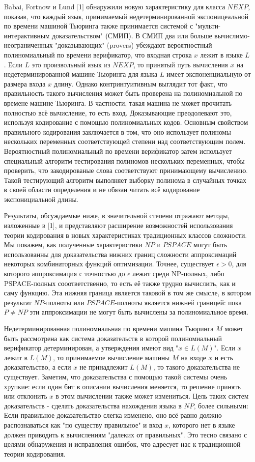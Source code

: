 \documentclass{article}
\newcommand{\blank} {
\newline
\newline
}
\theoremstyle{definition}
\begin{document}
\noindent Babai, Fortnow и Lund [1] обнаружили новую характеристику для класса $NEXP$, показав, что каждый язык, принимаемый недетерминированной экспоницеальной по времени машиной Тьюринга также принимается системой с "мульти-интерактивным доказательством" (СМИП). В СМИП два или больше вычислимо-неограниченных "доказывающих" (provers) убеждают вероятностный полиномиальный по времени верификатор, что входная строка $x$ лежит в языке $L$. Если $L$ это произвольный язык из $NEXP$, то принятый путь вычисления $x$ на недетерминированной машине Тьюринга для языка $L$ имеет экспоненциальную от размера входа $x$ длину. Однако контринтуитивным выглядит тот факт, что правильность такого вычисления может быть проверена на полиномиальной по времене машине Тьюринга. В частности, такая машина не может прочитать полностью всё вычисление, то есть вход. Доказывающие преодолевают это, используя кодирование с помощью полиномиальных кодов. Основным свойством правильного кодирования заключается в том, что оно использует полиномы нескольких переменных соответствующей степени над соответствующим полем. Вероятностный полиномиальный по времени верификатор затем использует специальный алгоритм тестирования полиномов нескольких переменных, чтобы проверить, что закодированые слова соответствуют принимающему вычислению. Такой тестирующий алгоритм выполняет выборку полинома в случайных точках в своей области определения и не обязан читать всё кодирование экспонициальной длины.
\blank
Результаты, обсуждаемые ниже, в значительной степени отражают методы, изложенные в [1], и представляют расширение возможностей использования теории кодирования в новых характеристиках традиционных классов сложности. Мы покажем, как полученные характеристики $NP$ и $PSPACE$ могут быть использованны для доказательства нижних границ сложности аппроксимаций некоторых комбинаторных функций оптимизации. Точнее, существует $\epsilon > 0$, для которого аппроксимация с точностью до $\epsilon$ лежит среди NP-полных, либо PSPACE-полных сооответственно, то есть её также трудно вычислить, как и саму функцию. Эта нижняя граница является таковой в том же смысле,  в котором результат $NP$-полноты или $PSPACE$-полноты является нижней границей: пока $P \neq NP$ эти аппроксимации не могут быть вычислены за полиномиальное время.
\blank
Недетерминированная полиномиальная по времени машина Тьюринга $M$ может быть рассмотрена как система доказательств в которой полиномиальный верификатор детерминирован, а утверждения имеют вид "$x \in L(M)$". Если $x$ лежит в $L(M)$, то принимаемое вычисление машины $M$ на входе $x$ и есть доказательство, а если $x$ не принадлежит $L(M)$, то такого доказательства не существует. Заметим, что доказательства с помощью такой системы очень хрупкие: если один бит в описании вычисления меняется, то решение принять или отклонить $x$ в этом вычислении также может измениться. Цель таких систем доказательств - сделать доказательства нахождения языка в $NP$, более сильными: Если правильное доказательство слегка изменено, оно всё равно должно распознаваться как "по существу правильное" и вход $x$, которого нет в языке должен приводить к вычислениям "далеких от правильных". Это тесно связано с целями обнаружения и исправления ошибок, что адресует нас к традиционной теории кодирования.
\end{document}
